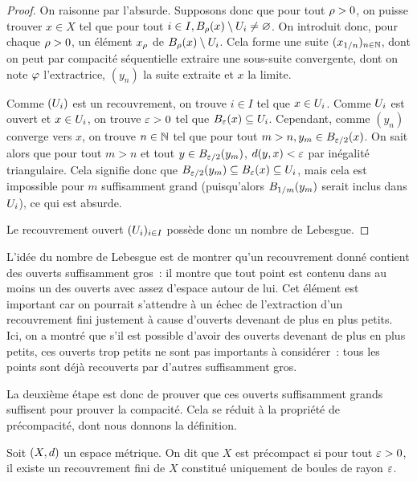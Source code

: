 \begin{proof}
  On raisonne par l'absurde. Supposons donc que pour tout $\LebNb > 0$, on
  puisse trouver $x \in X$ tel que pour tout
  $i \in I, \boule{x}{\LebNb} \setminus \varOp_i \neq \vide$. On introduit donc,
  pour chaque $\LebNb > 0$, un élément $x_{\LebNb}$ de
  $\boule{x}{\LebNb} \setminus \varOp_i$.
  Cela forme une suite $(x_{1/n})_{n\in \bN}$, dont on peut par compacité
  séquentielle extraire une sous-suite convergente, dont on note $\varextr$
  l'extractrice, $(y_n)$ la suite extraite et $x$ la limite.

  Comme $(\varOp_i)$ est un recouvrement, on trouve $i\in I$ tel que
  $x \in \varOp_i$.
  Comme $\varOp_i$ est ouvert et $x\in \varOp_i$, on trouve $\vareps > 0$ tel
  que $\boule{x}{\vareps}\subseteq \varOp_i$. Cependant, comme $(y_n)$ converge
  vers $x$, on trouve $n\in \bN$ tel que pour tout
  $m > n, y_m\in \boule{x}{\vareps/2}$. On sait alors que pour tout $m > n$ et
  tout $y\in \boule{y_m}{\vareps/2}$, $\vardis(y,x) < \vareps$ par inégalité
  triangulaire. Cela signifie donc que
  $\boule{y_m}{\vareps/2}\subseteq \boule{x}{\vareps}\subseteq \varOp_i$,
  mais cela est impossible pour $m$ suffisamment grand
  (puisqu'alors $\boule{y_m}{1/m}$ serait inclus dans $\varOp_i$),
  ce qui est absurde.

  Le recouvrement ouvert $(\varOp_i)_{i\in I}$ possède donc un nombre de
  Lebesgue.
\end{proof}

L'idée du nombre de Lebesgue est de montrer qu'un recouvrement donné contient
des ouverts suffisamment gros~: il montre que tout point est contenu dans au
moins un des ouverts avec assez d'espace autour de lui. Cet élément est
important car on pourrait s'attendre à un échec de l'extraction d'un
recouvrement fini justement à cause d'ouverts devenant de plus en plus petits.
Ici, on a montré que s'il est possible d'avoir des ouverts devenant de plus en
plus petits, ces ouverts trop petits ne sont pas importants à considérer~: tous
les points sont déjà recouverts par d'autres suffisamment gros.

La deuxième étape est donc de prouver que ces ouverts suffisamment grands
suffisent pour prouver la compacité. Cela se réduit à la propriété de
précompacité, dont nous donnons la définition.

\begin{definition}[Précompacité]
  Soit $(X,\vardis)$ un espace métrique. On dit que $X$ est précompact si pour
  tout $\vareps > 0$, il existe un recouvrement fini de $X$ constitué
  uniquement de boules de rayon $\vareps$.
\end{definition}


